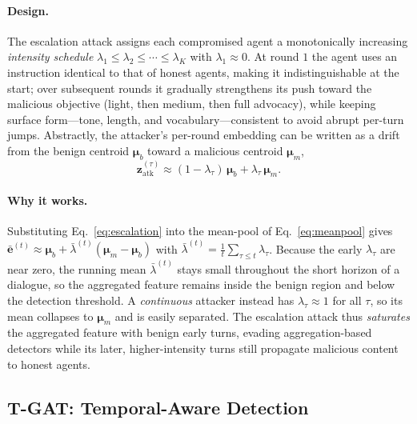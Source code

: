 \paragraph{Design.}
The escalation attack assigns each compromised agent a monotonically increasing
\emph{intensity schedule} $\lambda_1\le\lambda_2\le\cdots\le\lambda_K$ with
$\lambda_1\approx 0$. At round $1$ the agent uses an instruction identical to that
of honest agents, making it indistinguishable at the start; over subsequent rounds
it gradually strengthens its push toward the malicious objective (light, then
medium, then full advocacy), while keeping surface form---tone, length, and
vocabulary---consistent to avoid abrupt per-turn jumps. Abstractly, the
attacker's per-round embedding can be written as a drift from the benign centroid
$\boldsymbol{\mu}_b$ toward a malicious centroid $\boldsymbol{\mu}_m$,
\begin{equation}
\label{eq:escalation}
\mathbf{z}^{(\tau)}_{\text{atk}}\approx(1-\lambda_\tau)\,\boldsymbol{\mu}_b
+\lambda_\tau\,\boldsymbol{\mu}_m .
\end{equation}

\paragraph{Why it works.}
Substituting Eq.~\eqref{eq:escalation} into the mean-pool of
Eq.~\eqref{eq:meanpool} gives
$\bar{\mathbf{e}}^{(t)}\approx\boldsymbol{\mu}_b+\bar{\lambda}^{(t)}
(\boldsymbol{\mu}_m-\boldsymbol{\mu}_b)$ with
$\bar{\lambda}^{(t)}=\tfrac{1}{t}\sum_{\tau\le t}\lambda_\tau$. Because the early
$\lambda_\tau$ are near zero, the running mean $\bar{\lambda}^{(t)}$ stays small
throughout the short horizon of a dialogue, so the aggregated feature remains
inside the benign region and below the detection threshold. A \emph{continuous}
attacker instead has $\lambda_\tau\approx1$ for all $\tau$, so its mean collapses
to $\boldsymbol{\mu}_m$ and is easily separated. The escalation attack thus
\emph{saturates} the aggregated feature with benign early turns, evading
aggregation-based detectors while its later, higher-intensity turns still
propagate malicious content to honest agents.

\subsection{T-GAT: Temporal-Aware Detection}
\label{sec:method_tgat}

